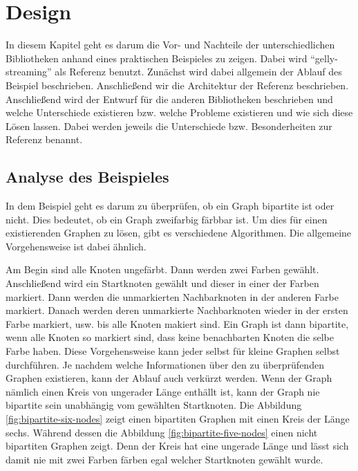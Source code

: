 \chapter{Design}
In diesem Kapitel geht es darum die Vor- und Nachteile der unterschiedlichen
Bibliotheken anhand eines praktischen Beispieles zu zeigen. Dabei wird
\enquote{gelly-streaming} als Referenz benutzt. Zunächst wird dabei allgemein
der Ablauf des Beispiel beschrieben. Anschließend wir die Architektur der
Referenz beschrieben. Anschließend wird der Entwurf für die anderen Bibliotheken
beschrieben und welche Unterschiede existieren bzw. welche Probleme existieren
und wie sich diese Lösen lassen. Dabei werden jeweils die Unterschiede bzw.
Besonderheiten zur Referenz benannt.

\section{Analyse des Beispieles}
In dem Beispiel geht es darum zu überprüfen, ob ein Graph bipartite ist oder
nicht. Dies bedeutet, ob ein Graph zweifarbig färbbar ist. Um dies für einen
existierenden Graphen zu lösen, gibt es verschiedene Algorithmen. Die allgemeine
Vorgehensweise ist dabei ähnlich.

Am Begin sind alle Knoten ungefärbt. Dann werden zwei Farben gewählt.
Anschließend wird ein Startknoten gewählt und dieser in einer der Farben markiert.
Dann werden die unmarkierten Nachbarknoten in der anderen Farbe markiert. Danach
werden deren unmarkierte Nachbarknoten wieder in der ersten Farbe markiert, usw.
bis alle Knoten makiert sind. Ein Graph ist dann bipartite, wenn alle Knoten so
markiert sind, dass keine benachbarten Knoten die selbe Farbe haben. Diese
Vorgehensweise kann jeder selbst für kleine Graphen selbst durchführen. Je nachdem
welche Informationen über den zu überprüfenden Graphen existieren, kann der Ablauf
auch verkürzt werden. Wenn der Graph nämlich einen Kreis von ungerader Länge
enthällt ist, kann der Graph nie bipartite sein unabhängig vom gewählten
Startknoten. Die Abbildung \ref{fig:bipartite-six-nodes} zeigt einen bipartiten
Graphen mit einen Kreis der Länge sechs. Während dessen die Abbildung \ref{fig:bipartite-five-nodes}
einen nicht bipartiten Graphen zeigt. Denn der Kreis hat eine ungerade Länge und
lässt sich damit nie mit zwei Farben färben egal welcher Startknoten gewählt
wurde. 

